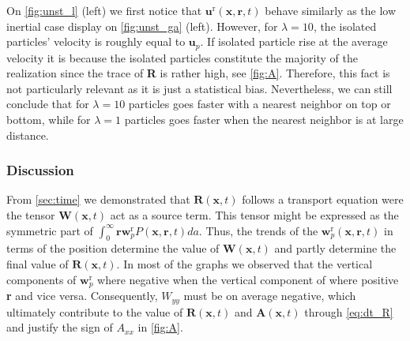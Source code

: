 On \ref{fig:unst_l} (left) we first notice that $\textbf{u}^\text{r}(\textbf{x},\textbf{r},t)$ behave similarly as the low inertial case display on \ref{fig:unst_ga} (left).
However, for $\lambda = 10$, the isolated particles' velocity is roughly equal to $\textbf{u}_p$. 
If isolated particle rise at the average velocity it is because the isolated particles constitute the majority of the realization since the trace of \textbf{R} is rather high, see \ref{fig:A}.
Therefore, this fact is not particularly relevant as it is just a statistical bias. 
Nevertheless, we can still conclude that for $\lambda = 10$ particles goes faster with a nearest neighbor on top or bottom, while for  $\lambda = 1$ particles goes faster when the nearest neighbor is at large distance. 


\subsubsection*{Discussion}

From \ref{sec:time} we demonstrated that $\textbf{R}(\textbf{x},t)$ follows a transport equation were the tensor $\textbf{W}(\textbf{x},t)$ act as a source term. 
This tensor might be expressed as the symmetric part of $\int_0^\infty \textbf{r} \textbf{w}_p^\text{r} P(\textbf{x},\textbf{r},t) da$. 
Thus, the trends of the $\textbf{w}_p^\text{r}(\textbf{x},\textbf{r},t) $ in terms of the position determine the value of $\textbf{W}(\textbf{x},t)$ and partly determine the final value of $\textbf{R}(\textbf{x},t)$. 
In most of the graphs we observed that the vertical components of $\textbf{w}_p^\text{r}$ where negative when the vertical component of where positive \textbf{r} and vice versa. 
Consequently, $W_{yy}$ must be on average negative, which ultimately contribute to the value of $\textbf{R}(\textbf{x},t)$ and $\textbf{A}(\textbf{x},t)$ through \ref{eq:dt_R} and justify the sign of $A_{xx}$ in \ref{fig:A}. 

